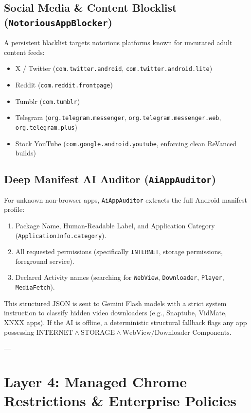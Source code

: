 \documentclass[11pt,a4paper]{article}
\begin{document}
\subsection{Social Media \& Content Blocklist (\texttt{NotoriousAppBlocker})}
A persistent blacklist targets notorious platforms known for uncurated adult content feeds:
\begin{itemize}
    \item X / Twitter (\texttt{com.twitter.android}, \texttt{com.twitter.android.lite})
    \item Reddit (\texttt{com.reddit.frontpage})
    \item Tumblr (\texttt{com.tumblr})
    \item Telegram (\texttt{org.telegram.messenger}, \texttt{org.telegram.messenger.web}, \texttt{org.telegram.plus})
    \item Stock YouTube (\texttt{com.google.android.youtube}, enforcing clean ReVanced builds)
\end{itemize}

\subsection{Deep Manifest AI Auditor (\texttt{AiAppAuditor})}
For unknown non-browser apps, \texttt{AiAppAuditor} extracts the full Android manifest profile:
\begin{enumerate}
    \item Package Name, Human-Readable Label, and Application Category (\texttt{ApplicationInfo.category}).
    \item All requested permissions (specifically \texttt{INTERNET}, storage permissions, foreground service).
    \item Declared Activity names (searching for \texttt{WebView}, \texttt{Downloader}, \texttt{Player}, \texttt{MediaFetch}).
\end{enumerate}
This structured JSON is sent to Gemini Flash models with a strict system instruction to classify hidden video downloaders (e.g., Snaptube, VidMate, XNXX apps). If the AI is offline, a deterministic structural fallback flags any app possessing $\text{INTERNET} \land \text{STORAGE} \land \text{WebView/Downloader Components}$.

---

\section{Layer 4: Managed Chrome Restrictions \& Enterprise Policies}
\end{document}

